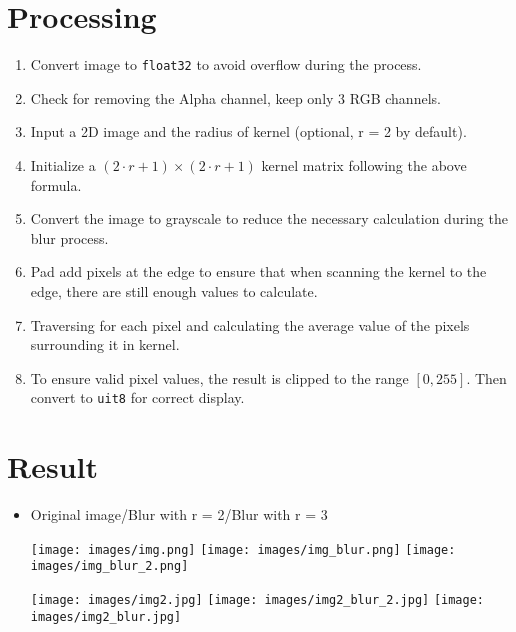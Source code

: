 \section{Processing}
\begin{enumerate}
    \item Convert image to \texttt{float32} to avoid overflow during the process.
    \item Check for removing the Alpha channel, keep only 3 RGB channels.
    \item Input a 2D image and the radius of kernel (optional, r = 2 by default).
    \item Initialize a \( (2 \cdot r + 1) \times (2 \cdot r + 1) \) kernel matrix following the above formula.
    \item Convert the image to grayscale to reduce the necessary calculation during the blur process.
    \item Pad add pixels at the edge to ensure that when scanning the kernel to the edge, there are still enough values to calculate.
    \item Traversing for each pixel and calculating the average value of the pixels surrounding it in kernel.
    \item To ensure valid pixel values, the result is clipped to the range \([0, 255]\). Then convert to \texttt{uit8} for correct display.
\end{enumerate}

\section{Result}
\begin{itemize}
    \item Original image/Blur with r = 2/Blur with r = 3
    \begin{center}
        \texttt{[image: images/img.png]}
        \texttt{[image: images/img\_blur.png]}
        \texttt{[image: images/img\_blur\_2.png]}
    \end{center} 
    \begin{center}
        \texttt{[image: images/img2.jpg]}
        \texttt{[image: images/img2\_blur\_2.jpg]}
        \texttt{[image: images/img2\_blur.jpg]}
    \end{center} 
\end{itemize}